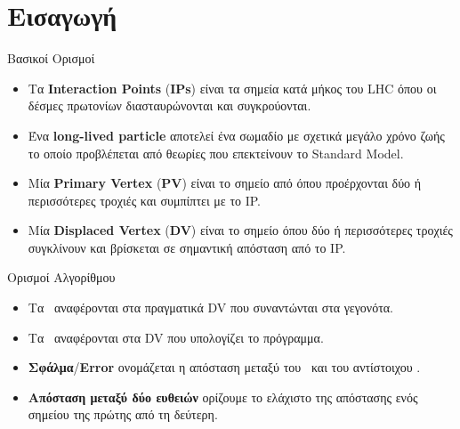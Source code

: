\section{Εισαγωγή}

\begin{frame}{Βασικοί Ορισμοί}
	
	\begin{itemize}
		\item Τα \textbf{Interaction Points} (\textbf{IPs}) είναι τα σημεία κατά μήκος του LHC όπου οι δέσμες πρωτονίων διασταυρώνονται και συγκρούονται.
		\item Ένα \textbf{long-lived particle} αποτελεί ένα σωμαδίο με σχετικά μεγάλο χρόνο ζωής το οποίο προβλέπεται από θεωρίες που επεκτείνουν το Standard Model.
		\item Μία \textbf{Primary Vertex} (\textbf{PV}) είναι το σημείο από όπου προέρχονται δύο ή περισσότερες τροχιές και συμπίπτει με το IP.
		\item Μία \textbf{Displaced Vertex} (\textbf{DV}) είναι το σημείο όπου δύο ή περισσότερες τροχιές συγκλίνουν και βρίσκεται σε σημαντική απόσταση από το IP. 
	\end{itemize}
\end{frame}

\begin{frame}{Ορισμοί Αλγορίθμου}
	
	\begin{itemize}
		\item Τα \dvtruebf\ αναφέρονται στα πραγματικά DV που συναντώνται στα γεγονότα.
		\item Τα \dvrecobf\ αναφέρονται στα DV που υπολογίζει το πρόγραμμα.
		\item \textbf{Σφάλμα}/\textbf{Error} ονομάζεται η απόσταση μεταξύ του \dvtrue\ και του αντίστοιχου \dvreco.
		\item \textbf{Απόσταση μεταξύ δύο ευθειών} ορίζουμε το ελάχιστο της απόστασης ενός σημείου της πρώτης από τη δεύτερη.
	\end{itemize}
\end{frame}

